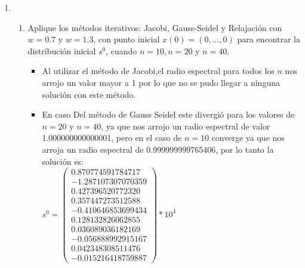 \documentclass{udpreport}
\begin{document}
\begin{enumerate}
\begin{enumerate}
     \end{enumerate}

 	\item 
 	\begin{enumerate}
 			\item Aplique los métodos iterativos: Jacobi, Gauss-Seidel y Relajación con $w = 0.7$ y $w = 1.3$, con punto inicial $x(0) = (0, . . . , 0)$ para encontrar la distribución inicial $s^0$, cuando $n = 10, n = 20$ y $n = 40$.
 			\begin{itemize}
 				\item Al utilizar el método de Jacobi,el radio espectral para todos los $n$ nos arrojo un valor mayor a 1 por lo que no se pudo llegar a ninguna solución con este método.
 				\item En caso Del método de Gauss Seidel este divergió para los valores de $n = 20$ y $n = 40$, ya que nos arrojo un radio espectral de valor  1.000000000000001, pero en el caso de $n = 10$ converge ya que nos arroja un radio espectral de 0.999999999765406, por lo tanto la solución es:\\
 				
 				$s^{0} = \left(\begin{array}{c} 0.870774591784717\\ -1.287107307070359\\ 0.427396520772320\\ 0.357447273512588\\ -0.410646853699434\\ 0.128132826062855\\ 0.036089036182169\\ -0.056888992915167\\ 0.042348308511476\\-0.015216418759887
 				\end{array}\right)*10^4$
 				\\
 				\\
 				

\end{itemize}
\end{enumerate}
\end{enumerate}
\end{document}
